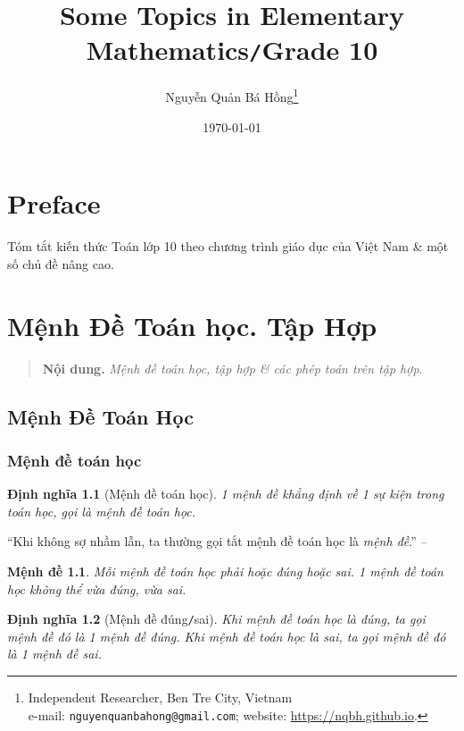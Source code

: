 \documentclass[oneside]{book}
\title{Some Topics in Elementary Mathematics\texttt{/}Grade 10}
\author{Nguyễn Quản Bá Hồng\footnote{Independent Researcher, Ben Tre City, Vietnam\\e-mail: \texttt{nguyenquanbahong@gmail.com}; website: \url{https://nqbh.github.io}.}}
\date{\today}
\numberwithin{equation}{section}
\newtheorem{dinhnghia}{Định nghĩa}[section]
\newtheorem{menhde}{Mệnh đề}[section]
\begin{document}
\frontmatter
\maketitle
\setcounter{secnumdepth}{4}
\setcounter{tocdepth}{3}
\tableofcontents
\newpage


\mainmatter

\chapter*{Preface}

Tóm tắt kiến thức Toán lớp 10 theo chương trình giáo dục của Việt Nam \& một số chủ đề nâng cao.


\chapter{Mệnh Đề Toán học. Tập Hợp}

\begin{quotation}
	\textbf{Nội dung.} \textit{Mệnh đề toán học, tập hợp \& các phép toán trên tập hợp}.
\end{quotation}

\section{Mệnh Đề Toán Học}

\subsection{Mệnh đề toán học}

\begin{dinhnghia}[Mệnh đề toán học]
	1 mệnh đề khẳng định về 1 sự kiện trong toán học, gọi là \emph{mệnh đề toán học}.
\end{dinhnghia}
``Khi không sợ nhầm lẫn, ta thường gọi tắt mệnh đề toán học là \textit{mệnh đề}.'' -- \cite[p. 5]{SGK_Toan_10_Canh_Dieu_tap_1}

\begin{menhde}
	 Mỗi mệnh đề toán học phải hoặc đúng hoặc sai. 1 mệnh đề toán học không thể vừa đúng, vừa sai.
\end{menhde}

\begin{dinhnghia}[Mệnh đề đúng\texttt{/}sai]
	Khi mệnh đề toán học là đúng, ta gọi mệnh đề đó là 1 \textit{mệnh đề đúng}. Khi mệnh đề toán học là sai, ta gọi mệnh đề đó là 1 \textit{mệnh đề sai}.
\end{dinhnghia}
\end{document}
